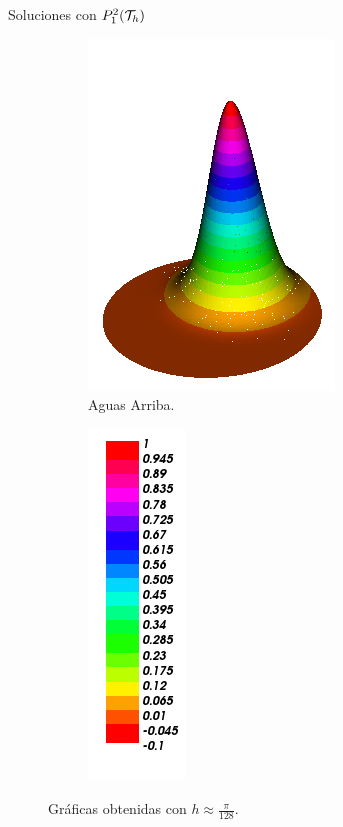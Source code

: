 \begin{frame}{Soluciones con $\relax{P}_1^2(\mathcal{T}_h)$}
\begin{figure}[h!]
\begin{subfigure}[b]{0.27\textwidth}
				\includegraphics[scale=0.22]{img/Conveccion_Reaccion/Recortes/steady_convect_react_approx_UPW_n_256.png}
				\caption{Aguas Arriba.}
			\end{subfigure}
			\begin{subfigure}[b]{0.15\textwidth}
				\centering
				\includegraphics[scale=0.22]{img/Conveccion_Reaccion/Recortes/steady_convect_react_values.png}
			\end{subfigure}
			\caption{Gráficas obtenidas con $h\approx\frac{\pi}{128}$.}
		\end{figure}
		\end{frame}
		
